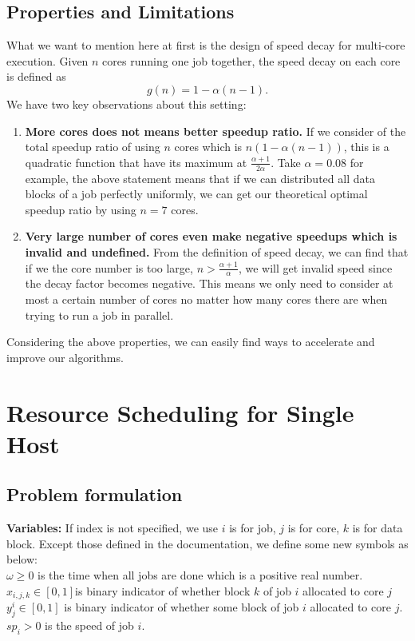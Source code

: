 \documentclass{llncs}
\begin{document}
\subsection*{Properties and Limitations}
What we want to mention here at first is the design of speed decay for multi-core execution.
Given $n$ cores running one job together, the speed decay on each core is defined as
\begin{equation}
    g(n) = 1 - \alpha(n-1).
\end{equation}
We have two key observations about this setting:
\begin{enumerate}[(i.)]
    \item \textbf{More cores does not means better speedup ratio.}
    If we consider of the total speedup ratio of using $n$ cores which is $n(1 - \alpha(n-1))$, this is a quadratic function that have its maximum at $\displaystyle\frac{\alpha + 1}{2 \alpha}$. Take $\alpha=0.08$ for example, the above statement means that if we can distributed all data blocks of a job perfectly uniformly, we can get our theoretical optimal speedup ratio by using $n=7$ cores.
    
    \item \textbf{Very large number of cores even make negative speedups which is invalid and undefined.}
    From the definition of speed decay, we can find that if we the core number is too large, $n > \displaystyle\frac{\alpha + 1}{\alpha}$, we will get invalid speed since the decay factor becomes negative. This means we only need to consider at most a certain number of cores no matter how many cores there are when trying to run a job in parallel.
\end{enumerate}
Considering the above properties, we can easily find ways to accelerate and improve our algorithms.

\section*{Resource Scheduling for Single Host}
\subsection*{Problem formulation}
\textbf{Variables:} If index is not specified, we use $i$ is for job, $j$ is for core, $k$ is for data block.
Except those defined in the documentation, we define some new symbols as below:\\
$\omega \ge 0$ is the time when all jobs are done which is a positive real number.\\
$x_{i,j,k}\in[0,1]$is binary indicator of whether block $k$ of job $i$ allocated to core $j$\\
$y^i_j\in[0,1]$ is binary indicator of whether some block of job $i$ allocated to core $j$.\\
$sp_i > 0$ is the speed of job $i$.
\end{document}
